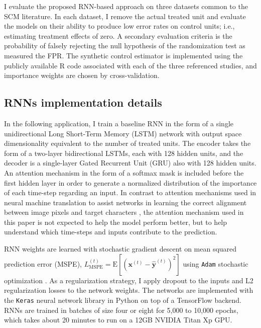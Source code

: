 \documentclass[hidelinks,12pt]{article}
\newcommand{\E}{\mathrm{E}}
\begin{document}
I evaluate the proposed RNN-based approach on three datasets common to the SCM literature. In each dataset, I remove the actual treated unit and evaluate the models on their ability to produce low error rates on control units; i.e., estimating treatment effects of zero. A secondary evaluation criteria is the probability of falsely rejecting the null hypothesis of the randomization test as measured the FPR. The synthetic control estimator is implemented using the publicly available \textsf{R} code associated with each of the three referenced studies, and importance weights are chosen by cross-validation. 

\subsection{RNNs implementation details}

In the following application, I train a baseline RNN in the form of a single unidirectional Long Short-Term Memory (LSTM) network \citep{schmidhuber1997long} with output space dimensionality equivalent to the number of treated units. The encoder takes the form of a two-layer bidirectional LSTMs, each with 128 hidden units, and the decoder is a single-layer Gated Recurrent Unit (GRU) \citep{chung2014} also with 128 hidden units. An attention mechanism in the form of a softmax mask is included before the first hidden layer in order to generate a normalized distribution of the importance of each time-step regarding an input. In contrast to attention mechanisms used in neural machine translation to assist networks in learning the correct alignment between image pixels and target characters \citep{cho2014learning,2017arXiv171204046P}, the attention mechanism used in this paper is not expected to help the model perform better, but to help understand which time-steps and inputs contribute to the prediction.

RNN weights are learned with stochastic gradient descent on mean squared prediction error (MSPE), $L^{(t)}_{\text{MSPE}} = \E \left[\left(\boldsymbol{x}^{(t)} - \boldsymbol{\hat{y}}^{(t)} \right)^2 \right]$ using \texttt{Adam} stochastic optimization \citep{kingma2014adam}. As a regularization strategy, I apply dropout to the inputs and L2 regularization losses to the network weights. The networks are implemented with the \texttt{Keras} neural network library \citep{chollet2015keras} in Python on top of a TensorFlow backend. RNNs are trained in batches of size four or eight for 5,000 to 10,000 epochs, which takes about 20 minutes to run on a 12GB NVIDIA Titan Xp GPU.
\end{document}
